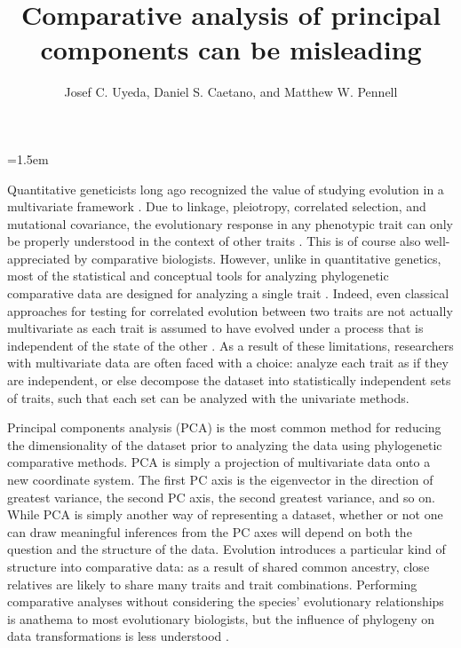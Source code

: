 \documentclass[a4paper,11pt]{article}
\title{Comparative analysis of principal components can be misleading}
\author{
Josef C. Uyeda, Daniel S. Caetano, and Matthew W. Pennell
}
\date{}
\affiliation{
Department of Biological Sciences \& Institute for Bioinformatics and Evolutionary Studies, University of Idaho, Moscow, ID 83844, U.S.A. 
}
\begin{document}
\mstitlepage
\parindent=1.5em
\addtolength{\parskip}{.3em}
\vfill
 
\finaltrue
\newpage
\singlespacing

\noindent Quantitative geneticists long ago recognized the value of studying evolution in a multivariate framework \citep{Pearson1903}. Due to linkage, pleiotropy, correlated selection, and mutational covariance, the evolutionary response in any phenotypic trait can only be properly understood in the context of other traits \citep{Lande1979, LynchWalsh}. This is of course also well-appreciated by comparative biologists. However, unlike in quantitative genetics, most of the statistical and conceptual tools for analyzing phylogenetic comparative data \citep[reviewed in][]{PennellHarmon} are designed for analyzing a single trait \citep[but see,][for exceptions]{RevellHarmon2008, RevellPCCA, Hohenlohe2008, RevellCollar2009, Schmitz2011, Bartoszek2012, Adams2014b,Adams2014}. Indeed, even classical approaches for testing for correlated evolution between two traits \citep[e.g.,][]{Felsenstein1985, Grafen1989, HarveyPagel1991} are not actually multivariate as each trait is assumed to have evolved under a process that is independent of the state of the other \citep{HansenOrzack2005}. As a result of these limitations, researchers with multivariate data are often faced with a choice: analyze each trait as if they are independent, or else decompose the dataset into statistically independent sets of traits, such that each set can be analyzed with the univariate methods.

Principal components analysis (PCA) is the most common method for reducing the dimensionality of the dataset prior to analyzing the data using phylogenetic comparative methods. PCA is simply a projection of multivariate data onto a new coordinate system. The first PC axis is the eigenvector in the direction of greatest variance, the second PC axis, the second greatest variance, and so on. While PCA is simply another way of representing a dataset, whether or not one can draw meaningful inferences from the PC axes will depend on both the question and the structure of the data. Evolution introduces a particular kind of structure into comparative data: as a result of shared common ancestry, close relatives are likely to share many traits and trait combinations. Performing comparative analyses without considering the species' evolutionary relationships is anathema to most evolutionary biologists, but the influence of phylogeny on data transformations is less understood \citep{Revell2008, Polly2013}.
\end{document}
